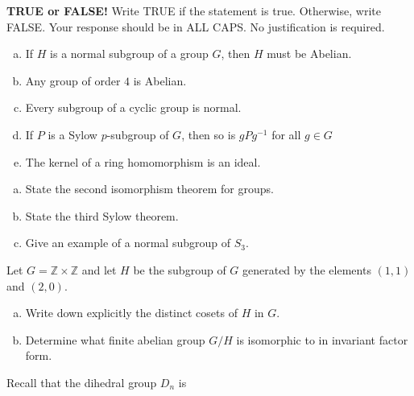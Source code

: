 \documentclass[11pt]{exam}
\theoremstyle{definition}
\begin{document}
\begin{questions}

\addpoints

\question[10]\mbox{}
\textbf{TRUE or FALSE!}  Write  TRUE if the statement is true.  Otherwise, write FALSE.  Your response should be in ALL CAPS.  No justification is required.
\begin{enumerate}[(a)]
\item  If $H$ is a normal subgroup of a group $G$, then $H$ must be Abelian.
\vspace{1.3in}
\item  Any group of order $4$ is Abelian.
\vspace{1.3in}
\item  Every subgroup of a cyclic group is normal.
\vspace{1.3in}
\item  If $P$ is a Sylow $p$-subgroup of $G$, then so is $gPg^{-1}$ for all $g\in G$
\vspace{1.3in}
\item  The kernel of a ring homomorphism is an ideal.
\vspace{1.3in}
\end{enumerate}

\newpage
\question[10]\mbox{}
\begin{enumerate}[(a)]
\item  State the second isomorphism theorem for groups.
\vspace{2in}
\item  State the third Sylow theorem.
\vspace{2in}
\item  Give an example of a normal subgroup of $S_3$.
\end{enumerate}

\newpage
\question[10]\mbox{}

Let $G = \mathbb Z\times \mathbb Z$ and let $H$ be the subgroup of $G$ generated by the elements $(1,1)$ and $(2,0)$.

\begin{enumerate}[(a)]
\item Write down explicitly the distinct cosets of $H$ in $G$.
\vspace{3in}
\item Determine what finite abelian group $G/H$ is isomorphic to in invariant factor form.
\end{enumerate}

\newpage
\question[10]\mbox{}

Recall that the dihedral group $D_n$ is


\end{questions}
\end{document}
